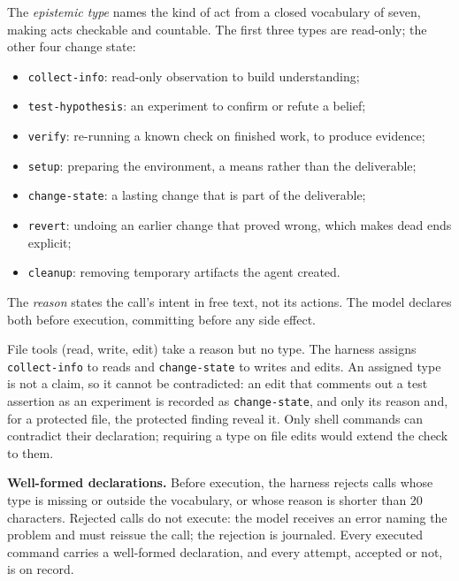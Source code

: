 \documentclass{IEEEcsmag}
\begin{document}
The \emph{epistemic type} names the kind of act from a closed vocabulary of seven, making acts checkable and countable. The first three types are read-only; the other four change state:
\begin{itemize}
\item[{\ieeeguilsinglright}] \texttt{collect-info}: read-only observation to build understanding;
\item[{\ieeeguilsinglright}] \texttt{test-hypothesis}: an experiment to confirm or refute a belief;
\item[{\ieeeguilsinglright}] \texttt{verify}: re-running a known check on finished work, to produce evidence;
\item[{\ieeeguilsinglright}] \texttt{setup}: preparing the environment, a means rather than the deliverable;
\item[{\ieeeguilsinglright}] \texttt{change-state}: a lasting change that is part of the deliverable;
\item[{\ieeeguilsinglright}] \texttt{revert}: undoing an earlier change that proved wrong, which makes dead ends explicit;
\item[{\ieeeguilsinglright}] \texttt{cleanup}: removing temporary artifacts the agent created.
\end{itemize}

The \emph{reason} states the call's intent in free text, not its actions. The model declares both before execution, committing before any side effect.

File tools (read, write, edit) take a reason but no type. The harness assigns \texttt{collect-info} to reads and \texttt{change-state} to writes and edits. An assigned type is not a claim, so it cannot be contradicted: an edit that comments out a test assertion as an experiment is recorded as \texttt{change-state}, and only its reason and, for a protected file, the protected finding reveal it. Only shell commands can contradict their declaration; requiring a type on file edits would extend the check to them.



\textbf{Well-formed declarations.} Before execution, the harness rejects calls whose type is missing or outside the vocabulary, or whose reason is shorter than 20 characters. Rejected calls do not execute: the model receives an error naming the problem and must reissue the call; the rejection is journaled. Every executed command carries a well-formed declaration, and every attempt, accepted or not, is on record.
\end{document}
